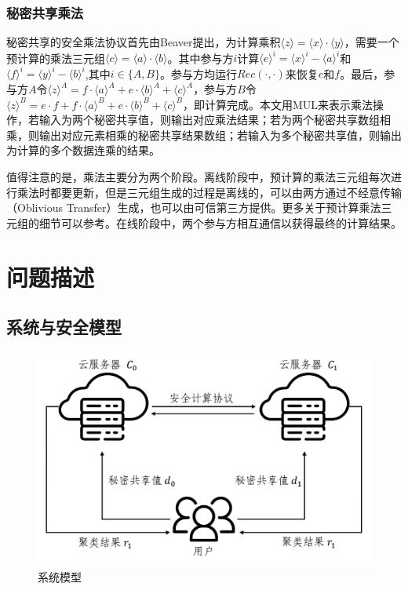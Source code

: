 \subsubsection{秘密共享乘法}
秘密共享的安全乘法协议首先由Beaver\cite{beaver1992efficient}提出，为计算乘积$\langle z\rangle=\langle x\rangle \cdot\langle y\rangle$，需要一个预计算的乘法三元组$\langle c\rangle=\langle a\rangle \cdot\langle b\rangle$。其中参与方$ i $计算$ \langle e \rangle^i = \langle x \rangle^i - \langle a \rangle^i $和$\langle f\rangle^i=\langle y\rangle^i-\langle b\rangle^i$,其中$ i \in \{A, B\}$。参与方均运行$ Rec(\cdot, \cdot) $来恢复$ e $和$ f $。最后，参与方$ A $令$\langle z\rangle^A=f \cdot\langle a\rangle^A+e \cdot\langle b\rangle^A+\langle c\rangle^A$，参与方$ B $令$\langle z\rangle^B=e \cdot f+f \cdot\langle a\rangle^B+e \cdot\langle b\rangle^B+\langle c\rangle^B$，即计算完成。本文用MUL来表示乘法操作，若输入为两个秘密共享值，则输出对应乘法结果；若为两个秘密共享数组相乘，则输出对应元素相乘的秘密共享结果数组；若输入为多个秘密共享值，则输出为计算的多个数据连乘的结果。

值得注意的是，乘法主要分为两个阶段。离线阶段中，预计算的乘法三元组每次进行乘法时都要更新，但是三元组生成的过程是离线的，可以由两方通过不经意传输（Oblivious Transfer）生成\cite{schneider2013gmw}，也可以由可信第三方提供\cite{riazi2018chameleon}。更多关于预计算乘法三元组的细节可以参考\cite{beaver1992efficient}。在线阶段中，两个参与方相互通信以获得最终的计算结果。
\section{问题描述}
\label{s3-wenti}

\subsection{系统与安全模型}
\begin{figure}[htbp]
	\centering
	\includegraphics[width=0.75\linewidth]{img/sysmodel1.png}%
	\caption{系统模型}
	\label{sys model}
\end{figure}


